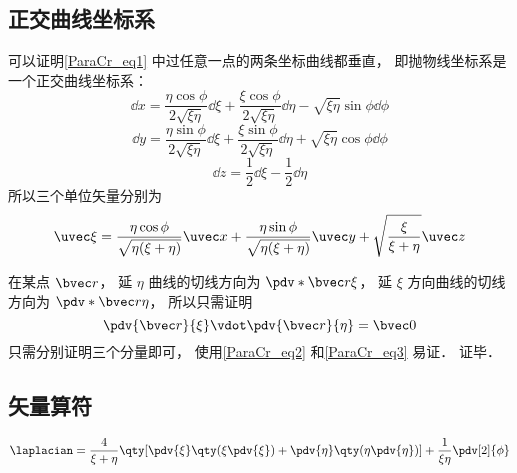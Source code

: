 \subsection{正交曲线坐标系}
可以证明\autoref{ParaCr_eq1} 中过任意一点的两条坐标曲线都垂直， 即抛物线坐标系是一个正交曲线坐标系：
\begin{equation}
\dd{x} = \frac{\eta \cos\phi}{2\sqrt{\xi\eta}}\dd{\xi} + \frac{\xi \cos\phi}{2\sqrt{\xi\eta}}\dd{\eta} - \sqrt{\xi\eta}\sin\phi\dd{\phi}
\end{equation}
\begin{equation}
\dd{y} = \frac{\eta \sin\phi}{2\sqrt{\xi\eta}}\dd{\xi} + \frac{\xi \sin\phi}{2\sqrt{\xi\eta}}\dd{\eta} + \sqrt{\xi\eta}\cos\phi\dd{\phi}
\end{equation}
\begin{equation}
\dd{z} = \frac{1}{2}\dd{\xi} - \frac{1}{2}\dd{\eta}
\end{equation}
所以三个单位矢量分别为
\begin{equation}
\uvec \xi = \frac{\eta \cos\phi}{\sqrt{\eta(\xi+\eta)}}\uvec x + \frac{\eta \sin\phi}{\sqrt{\eta(\xi+\eta)}}\uvec y + \sqrt{\frac{\xi}{\xi+\eta}}\uvec z
\end{equation}


在某点 $\bvec r$， 延 $\eta$ 曲线的切线方向为 $\pdv*{\bvec r}{\xi}$， 延 $\xi$ 方向曲线的切线方向为 $\pdv*{\bvec r}{\eta}$， 所以只需证明
\begin{equation}
\pdv{\bvec r}{\xi} \vdot \pdv{\bvec r}{\eta} = \bvec 0
\end{equation}
只需分别证明三个分量即可， 使用\autoref{ParaCr_eq2} 和\autoref{ParaCr_eq3} 易证． 证毕．

\subsection{矢量算符}
\begin{equation}
\laplacian = \frac{4}{\xi + \eta} \qty[\pdv{\xi}\qty(\xi\pdv{\xi}) + \pdv{\eta}\qty(\eta\pdv{\eta})] + \frac{1}{\xi\eta}\pdv[2]{\phi}
\end{equation}

